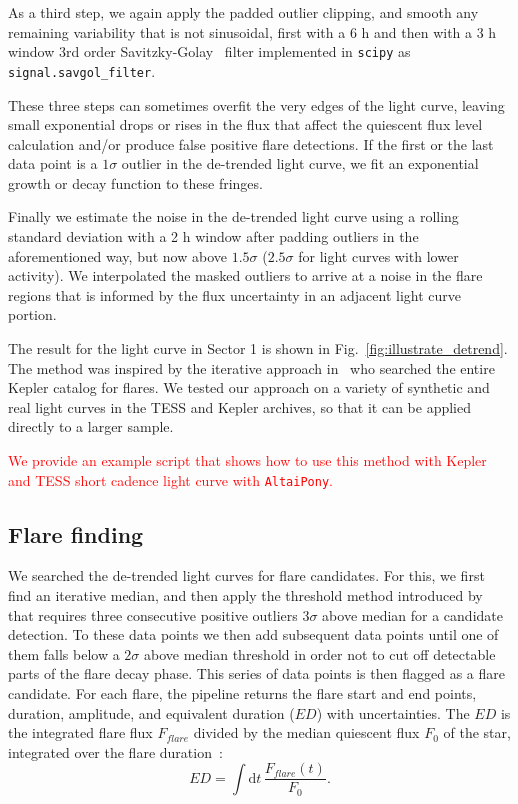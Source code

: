\documentclass[fleqn,usenatbib,letters]{mnras}%
\begin{document}
As a third step, we again apply the padded outlier clipping, and smooth any remaining variability that is not sinusoidal, first with a 6 h and then with a 3 h window 3rd order Savitzky-Golay~\citep{savitzky1964} filter implemented in \texttt{scipy} as \texttt{signal.savgol\_filter}.

These three steps can sometimes overfit the very edges of the light curve, leaving small exponential drops or rises in the flux that affect the quiescent flux level calculation and/or produce false positive flare detections. If the first or the last data point is a $1\sigma$ outlier in the de-trended light curve, we fit an exponential growth or decay function to these fringes.

Finally we estimate the noise in the de-trended light curve using a rolling standard deviation with a 2 h window after padding outliers in the aforementioned way, but now above $1.5 \sigma$ ($2.5 \sigma$ for light curves with lower activity). We interpolated the masked outliers to arrive at a noise in the flare regions that is informed by the flux uncertainty in an adjacent light curve portion.

The result for the light curve in Sector 1 is shown in Fig.~\ref{fig:illustrate_detrend}. The method was inspired by the iterative approach in~\citet{davenport2016} who searched the entire Kepler catalog for flares. We tested our approach on a variety of synthetic and real light curves in the TESS and Kepler archives, so that it can be applied directly to a larger sample.

\textcolor{red}{We provide an example script that shows how to use this method with Kepler and TESS short cadence light curve with \texttt{AltaiPony}.}

\subsection{Flare finding}
\label{sec:flarefind}
We searched the de-trended light curves for flare candidates. For this, we first find an iterative median, and then apply the threshold method introduced by~\citep{chang2015} that requires three consecutive positive outliers $3 \sigma$ above median for a candidate detection. To these data points we then add subsequent data points until one of them falls below a $2 \sigma$ above median threshold in order not to cut off detectable parts of the flare decay phase. This series of data points is then flagged as a flare candidate. For each flare, the pipeline returns the flare start and end points, duration, amplitude, and equivalent duration ($ED$) with uncertainties. The $ED$ is the integrated flare flux $F_{flare}$ divided by the median quiescent flux $F_0$ of the star, integrated over the flare duration~\citep{gershberg1972}:
\begin{equation}
\label{eq:ED}
ED=\displaystyle \int \mathrm dt\, \frac{F_{flare}(t)}{F_0}.
\end{equation}
\end{document}
